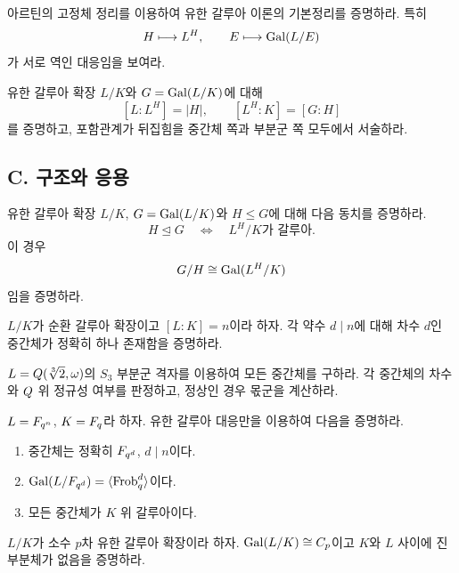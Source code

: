 \begin{exercise}[*]
아르틴의 고정체 정리를 이용하여 유한 갈루아 이론의 기본정리를 증명하라. 특히
\[
  H\longmapsto L^H,
  \qquad
  E\longmapsto\operatorname{Gal}(L/E)
\]
가 서로 역인 대응임을 보여라.
\end{exercise}

\begin{exercise}
유한 갈루아 확장 $L/K$와 $G=\operatorname{Gal}(L/K)$에 대해
\[
  [L:L^H]=|H|,
  \qquad
  [L^H:K]=[G:H]
\]
를 증명하고, 포함관계가 뒤집힘을 중간체 쪽과 부분군 쪽 모두에서 서술하라.
\end{exercise}

\subsection*{C. 구조와 응용}

\begin{exercise}[*]
유한 갈루아 확장 $L/K$, $G=\operatorname{Gal}(L/K)$와 $H\le G$에 대해 다음 동치를 증명하라.
\[
  H\trianglelefteq G
  \quad\Longleftrightarrow\quad
  L^H/K\text{가 갈루아}.
\]
이 경우
\[
  G/H\cong\operatorname{Gal}(L^H/K)
\]
임을 증명하라.
\end{exercise}

\begin{exercise}
$L/K$가 순환 갈루아 확장이고 $[L:K]=n$이라 하자. 각 약수 $d\mid n$에 대해 차수 $d$인 중간체가 정확히 하나 존재함을 증명하라.
\end{exercise}

\begin{exercise}[*]
$L=Q(\sqrt[3]{2},\omega)$의 $S_3$ 부분군 격자를 이용하여 모든 중간체를 구하라. 각 중간체의 차수와 $Q$ 위 정규성 여부를 판정하고, 정상인 경우 몫군을 계산하라.
\end{exercise}

\begin{exercise}[*]
$L=F_{q^n}$, $K=F_q$라 하자. 유한 갈루아 대응만을 이용하여 다음을 증명하라.
\begin{enumerate}[label=(\alph*)]
  \item 중간체는 정확히 $F_{q^d}$, $d\mid n$이다.
  \item $\operatorname{Gal}(L/F_{q^d})=\langle\operatorname{Frob}_q^d\rangle$이다.
  \item 모든 중간체가 $K$ 위 갈루아이다.
\end{enumerate}
\end{exercise}

\begin{exercise}
$L/K$가 소수 $p$차 유한 갈루아 확장이라 하자. $\operatorname{Gal}(L/K)\cong C_p$이고 $K$와 $L$ 사이에 진부분체가 없음을 증명하라.
\end{exercise}

